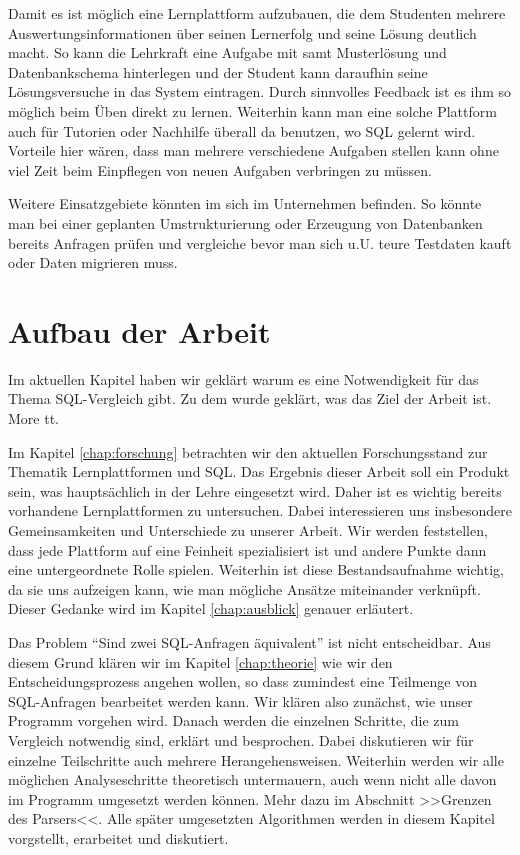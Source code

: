 Damit es ist möglich eine Lernplattform aufzubauen, die dem Studenten mehrere Auswertungsinformationen über seinen Lernerfolg und seine Lösung deutlich macht. So kann die Lehrkraft eine Aufgabe mit samt Musterlösung und Datenbankschema hinterlegen und der Student kann daraufhin seine Lösungsversuche in das System eintragen. Durch sinnvolles Feedback ist es ihm so möglich beim Üben direkt zu lernen. Weiterhin kann man eine solche Plattform auch für Tutorien oder Nachhilfe überall da benutzen, wo SQL gelernt wird. Vorteile hier wären, dass man mehrere verschiedene Aufgaben stellen kann ohne viel Zeit beim Einpflegen von neuen Aufgaben verbringen zu müssen.

Weitere Einsatzgebiete könnten im sich im Unternehmen befinden. So könnte man bei einer geplanten Umstrukturierung oder Erzeugung von Datenbanken bereits Anfragen prüfen und vergleiche bevor man sich u.U. teure Testdaten kauft oder Daten migrieren muss.

\section{Aufbau der Arbeit}

Im aktuellen Kapitel haben wir geklärt warum es eine Notwendigkeit für das Thema SQL-Vergleich gibt. Zu dem wurde geklärt, was das Ziel der Arbeit ist. More tt.

Im Kapitel \ref{chap:forschung} betrachten wir den aktuellen Forschungsstand zur Thematik Lernplattformen und SQL. Das Ergebnis dieser Arbeit soll ein Produkt sein, was hauptsächlich in der Lehre eingesetzt wird. Daher ist es wichtig bereits vorhandene Lernplattformen zu untersuchen. Dabei interessieren uns insbesondere Gemeinsamkeiten und Unterschiede zu unserer Arbeit. Wir werden feststellen, dass jede Plattform auf eine Feinheit spezialisiert ist und andere Punkte dann eine untergeordnete Rolle spielen. Weiterhin ist diese Bestandsaufnahme wichtig, da sie uns aufzeigen kann, wie man mögliche Ansätze miteinander verknüpft. Dieser Gedanke wird im Kapitel \ref{chap:ausblick} genauer erläutert.

Das Problem ``Sind zwei SQL-Anfragen äquivalent'' ist nicht entscheidbar. Aus diesem Grund klären wir im Kapitel \ref{chap:theorie} wie wir den Entscheidungsprozess angehen wollen, so dass zumindest eine Teilmenge von SQL-Anfragen bearbeitet werden kann. Wir klären also zunächst, wie unser Programm vorgehen wird. Danach werden die einzelnen Schritte, die zum Vergleich notwendig sind, erklärt und besprochen. Dabei diskutieren wir für einzelne Teilschritte auch mehrere Herangehensweisen. Weiterhin werden wir alle möglichen Analyseschritte theoretisch untermauern, auch wenn nicht alle davon im Programm umgesetzt werden können. Mehr dazu im Abschnitt >>Grenzen des Parsers<<. Alle später umgesetzten Algorithmen werden in diesem Kapitel vorgstellt, erarbeitet und diskutiert.


